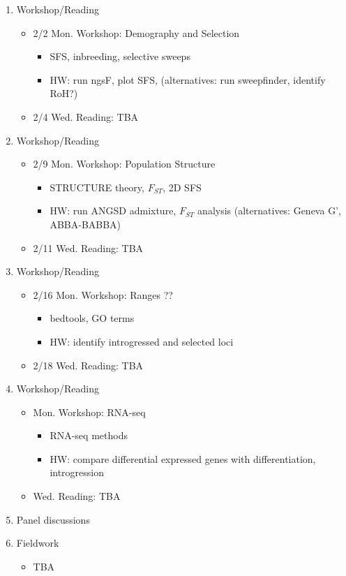 \documentclass[]{article}
\begin{document}
\begin{enumerate}
\item Workshop/Reading
	\begin{itemize}
	\item 2/2 Mon. Workshop: Demography and Selection
		\begin{itemize}
		\item SFS, inbreeding, selective sweeps
		\item HW: run ngsF, plot SFS, (alternatives: run sweepfinder, identify RoH?)
		\end{itemize}
	\item 2/4 Wed. Reading: TBA
\end{itemize}

\item Workshop/Reading
	\begin{itemize}
	\item 2/9 Mon. Workshop: Population Structure
		\begin{itemize}
		\item STRUCTURE theory, $F_{ST}$, 2D SFS
		\item HW: run ANGSD admixture, $F_{ST}$ analysis (alternatives: Geneva G', ABBA-BABBA)
		\end{itemize}
	\item 2/11 Wed. Reading: TBA
\end{itemize}

\item Workshop/Reading
	\begin{itemize}
	\item 2/16 Mon. Workshop: Ranges ??
		\begin{itemize}
		\item bedtools, GO terms
		\item HW: identify introgressed and selected loci
		\end{itemize}
	\item 2/18 Wed. Reading: TBA
\end{itemize}

\item Workshop/Reading
	\begin{itemize}
	\item Mon. Workshop: RNA-seq
		\begin{itemize}
		\item RNA-seq methods
		\item HW: compare differential expressed genes with differentiation, introgression
		\end{itemize}
	\item Wed. Reading: TBA
\end{itemize}

\item Panel discussions

\item Fieldwork
\begin{itemize}
\item TBA
\end{itemize}


\end{enumerate}
\end{document}
